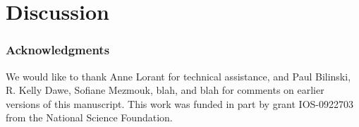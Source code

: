 \documentclass[12pt]{article}
\begin{document}
\section{Discussion}

\subsubsection*{Acknowledgments}
We would like to thank Anne Lorant for technical assistance, and Paul Bilinski, R. Kelly Dawe, Sofiane Mezmouk, blah, and blah for comments on earlier versions of this manuscript.  This work was funded in part by grant IOS-0922703 from the National Science Foundation.

\clearpage

\end{document}
